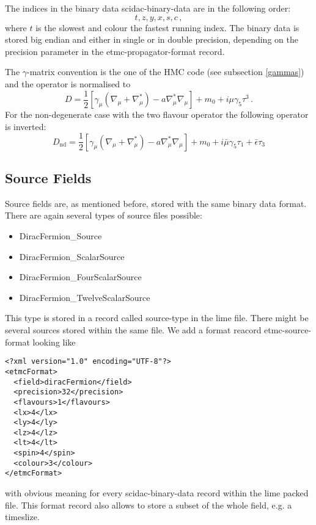 The indices in the binary data {\ttfamily scidac-binary-data} are in
the following order:
\[
t, z, y, x, s, c\, ,
\]
where $t$ is the slowest and colour the fastest running index.
The binary data is stored big endian and either in single or in double
precision, depending on the {\ttfamily precision} parameter in the
{\ttfamily etmc-propagator-format} record. 

The $\gamma$-matrix convention is the one of the HMC code (see
subsection \ref{gammas}) and the operator is normalised to
\[
D =
\frac{1}{2}[\gamma_\mu(\nabla_\mu+\nabla_\mu^*)-a\nabla_\mu^*\nabla_\mu]
+ m_0 + i \mu\gamma_5\tau^3\, .
\]
For the non-degenerate case with the two flavour operator the
following operator is inverted:
\[
D_\mathrm{nd} =
\frac{1}{2}[\gamma_\mu(\nabla_\mu+\nabla_\mu^*)-a\nabla_\mu^*\nabla_\mu]
+ m_0 + i\bar\mu\gamma_5\tau_1+\bar\epsilon\tau_3
\]

\subsection{Source Fields}

Source fields are, as mentioned before, stored with the same binary
data format. There are again several types of source files possible:
\begin{itemize}
\item {\ttfamily DiracFermion\_Source}
\item {\ttfamily DiracFermion\_ScalarSource}
\item {\ttfamily DiracFermion\_FourScalarSource}
\item {\ttfamily DiracFermion\_TwelveScalarSource}
\end{itemize}
This type is stored in a record called {\ttfamily source-type} in the
lime file. There might be several sources stored within the same
file. We add a format reacord {\ttfamily etmc-source-format} looking like
\begin{verbatim}
<?xml version="1.0" encoding="UTF-8"?>
<etmcFormat>
  <field>diracFermion</field>
  <precision>32</precision>
  <flavours>1</flavours>
  <lx>4</lx>
  <ly>4</ly>
  <lz>4</lz>
  <lt>4</lt>
  <spin>4</spin>
  <colour>3</colour>
</etmcFormat>
\end{verbatim}
with obvious meaning for every {\ttfamily scidac-binary-data} record
within the lime packed file. This format record also allows to store a
subset of the whole field, e.g. a timeslize.

